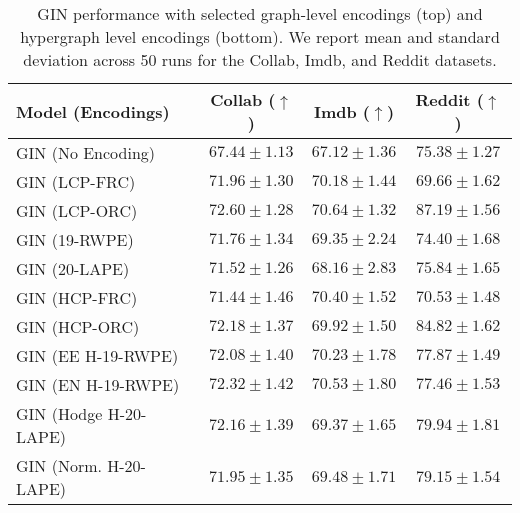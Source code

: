 \begin{table*}[ht!]
\centering
\footnotesize
\begin{tabular}{|l|c|c|c|}
\hline
\textbf{Model (Encodings)} & \textbf{Collab} ($\uparrow$) & \textbf{Imdb} ($\uparrow$) & \textbf{Reddit} ($\uparrow$) \\
\hline
GIN (No Encoding)          & $67.44 \pm 1.13$ & $67.12 \pm 1.36$ & $75.38 \pm 1.27$ \\ \hline
GIN (LCP-FRC)              & $71.96 \pm 1.30$ & $70.18 \pm 1.44$ & $69.66 \pm 1.62$\\
GIN (LCP-ORC)              & $\mathbf{72.60 \pm 1.28}$ & $\mathbf{70.64 \pm 1.32}$ & $\mathbf{87.19 \pm 1.56}$\\
GIN (19-RWPE)                 & $71.76 \pm 1.34$ & $69.35 \pm 2.24$ & $74.40 \pm 1.68$ \\
GIN (20-LAPE)                 & $71.52 \pm 1.26$ & $68.16 \pm 2.83$ & $75.84 \pm 1.65$ \\
\hline
GIN (HCP-FRC)              & $71.44 \pm 1.46$ & $70.40 \pm 1.52$ & $70.53 \pm 1.48$ \\
GIN (HCP-ORC)              & $72.18 \pm 1.37$ & $69.92 \pm 1.50$ & $84.82 \pm 1.62$ \\
GIN (EE H-19-RWPE)            & $72.08 \pm 1.40$ & $70.23 \pm 1.78$ & $77.87 \pm 1.49$ \\
GIN (EN H-19-RWPE)            & $72.32 \pm 1.42$ & $70.53 \pm 1.80$ & $77.46 \pm 1.53$ \\
GIN (Hodge H-20-LAPE)         & $72.16 \pm 1.39$ & $69.37 \pm 1.65$ & $79.94 \pm 1.81$\\
GIN (Norm. H-20-LAPE)         & $71.95 \pm 1.35$ & $69.48 \pm 1.71$ & $79.15 \pm 1.54$\\
\hline
\end{tabular}
\caption{GIN performance with selected graph-level encodings (top) and hypergraph level encodings (bottom). We report mean and standard deviation across 50 runs for the Collab, Imdb, and Reddit datasets.}
\label{tab:gin_selected}
\end{table*}